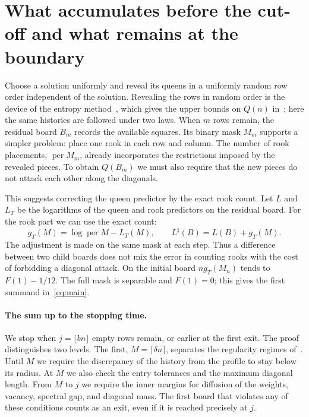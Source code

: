 \section{What accumulates before the cut-off and what remains at the boundary}\label{sec:signedmap}
Choose a solution uniformly and reveal its queens in a uniformly random row order independent of the
solution. Revealing the rows in random order is the device of the entropy method~\cite{rad,ll}, which
gives the upper bounds on \(Q(n)\) in~\cite{luria,simkin}; here the same histories are followed under
two laws. When \(m\) rows remain, the residual board \(B_m\) records the available squares. Its binary
mask \(M_m\) supports a simpler problem: place one rook in each row and column. The number of
rook placements, \(\operatorname{per}M_m\), already incorporates the restrictions imposed by the revealed
pieces. To obtain \(Q(B_m)\) we must also require that the new pieces do not attack each other along the
diagonals.

This suggests correcting the queen predictor by the exact rook count. Let \(L\) and \(L_T\) be the
logarithms of the queen and rook predictors on
the residual board. For the rook part we can use the exact count:
\[
 g_T(M)=\log\operatorname{per}M-L_T(M),\qquad L^\sharp(B)=L(B)+g_T(M).
\]
The adjustment is made on the same mask at each step. Thus a difference between two child boards does not
mix the error in counting rooks with the cost of forbidding a diagonal attack. On the initial board \(n
g_T(M_n)\) tends to \(F(1)-1/12\). The full mask is separable and \(F(1)=0\); this gives the first
summand in~\eqref{eq:main}.

\paragraph{The sum up to the stopping time.} We stop when \(j=\lfloor bn\rfloor\) empty rows remain, or
earlier at the first exit. The proof distinguishes two levels. The first, \(M=\lceil\delta n\rceil\),
separates the regularity regimes of~\cite[Definition~2.2 and \S5.4]{tc}. Until \(M\) we require the
discrepancy of the history from the profile to stay below its radius. At \(M\) we also check the entry
tolerances and the maximum diagonal length. From \(M\) to \(j\) we require the inner margins for
diffusion of the weights, vacancy, spectral gap, and diagonal mass. The first board that violates any
of these conditions counts as an exit, even if it is reached precisely at \(j\).

